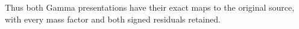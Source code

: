 Thus both Gamma presentations have their exact maps to the original
source, with every mass factor and both signed residuals retained.
